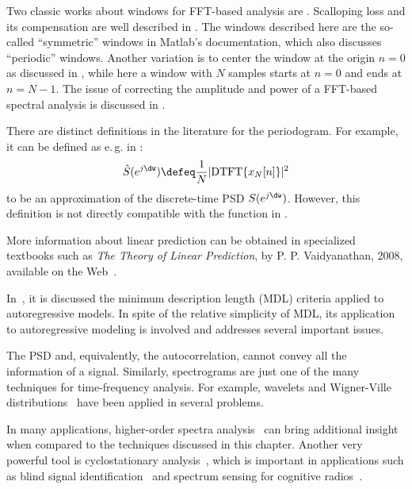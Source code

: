 Two classic works about windows for FFT-based analysis are \cite{Harris78,Nuttall81}.
Scalloping loss and its compensation are well described in \cite{Lyons11}.
The windows described here are the so-called ``symmetric'' windows in Matlab's documentation, which also discusses ``periodic'' windows. Another variation is to center the window at the origin $n=0$ as discussed in \cite{Harris78}, while here a window with $N$ samples starts at $n=0$ and ends at $n=N-1$.
The issue of correcting the amplitude and power of a FFT-based spectral analysis is discussed in \cite{Brandt11}.

There are distinct definitions in the literature for the periodogram. For example, it can be defined as e.\,g. in : 
\begin{equation}
\hat S(e^{j \dw}) \defeq \frac{1}{N} |\textrm{DTFT} \{ x_N[n] \}|^2
\label{eq:periodogram_notusedDefinition}
\end{equation}
to be an approximation of the discrete-time PSD $S(e^{j \dw})$. However, this definition is not directly compatible with the  function in {\matlab}.

More information about linear prediction can be obtained in specialized textbooks such as 
\emph{The Theory of Linear Prediction}, by P. P. Vaidyanathan, 2008, available on the Web~.

In~\cite{Huang90b}, it is discussed the minimum description length (MDL) criteria applied to autoregressive models. In spite of the relative simplicity of MDL, its application to autoregressive modeling is involved and \cite{Huang90b} addresses several important issues.

The PSD and, equivalently, the autocorrelation, cannot convey all the information of a signal. 
Similarly, spectrograms are just one of the many techniques for time-frequency analysis. For example, wavelets and Wigner-Ville distributions~\cite{VetterliK95,Mallat08} have been applied in several problems.

In many applications, higher-order spectra analysis~\cite{Nikias93} can bring additional insight when compared to the techniques discussed in this chapter. Another very powerful tool is cyclostationary analysis~\cite{BookGardner94,Giannakis99}, which is important in applications such as blind signal identification~\cite{Gini98} and spectrum sensing for cognitive radios~\cite{Deepa2010}.

